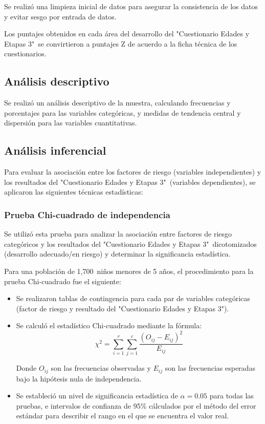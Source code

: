 \documentclass[11pt,letterpaper]{report}
\newcommand{\muestradeseada}{1,700}
\newcommand{\asq}{"Cuestionario Edades y Etapas 3"}
\begin{document}
Se realizó una limpieza inicial de datos para asegurar la consistencia de los
datos y evitar sesgo por entrada de datos.

Los puntajes obtenidos en cada área del desarrollo del \asq\ se convirtieron a
puntajes Z de acuerdo a la ficha técnica de los cuestionarios. 
	
\subsection{Análisis descriptivo}
Se realizó un análisis descriptivo de la muestra, calculando frecuencias y
porcentajes para las variables categóricas, y medidas de tendencia central y
dispersión para las variables cuantitativas.

\subsection{Análisis inferencial}
Para evaluar la asociación entre los factores de riesgo (variables
independientes) y los resultados del \asq\ (variables dependientes), se
aplicaron las siguientes técnicas estadísticas:

\subsubsection{Prueba Chi-cuadrado de independencia}
Se utilizó esta prueba para analizar la asociación entre factores de riesgo
categóricos y los resultados del \asq\ dicotomizados (desarrollo adecuado/en
riesgo) y determinar la significancia estadística.

Para una población de \muestradeseada\ niños menores de 5 años, el
procedimiento para la prueba Chi-cuadrado fue el siguiente:

\begin{itemize}
    \item Se realizaron tablas de contingencia para cada par de variables
		categóricas (factor de riesgo y resultado del \asq).
    
    \item Se calculó el estadístico Chi-cuadrado mediante la fórmula:
    \[
    \chi^2 = \sum_{i=1}^r \sum_{j=1}^c \frac{(O_{ij} - E_{ij})^2}{E_{ij}}
    \]
    
    Donde \( O_{ij} \) son las frecuencias observadas y \( E_{ij} \) son las
	frecuencias esperadas bajo la hipótesis nula de independencia.
    
    \item Se estableció un nivel de significancia estadística de $\alpha = 0.05$
		para todas las pruebas, e intervalos de confianza de 95\% cálculados
		por el método del error estándar para describir el rango en el que se
		encuentra el valor real.
\end{itemize}
\end{document}
